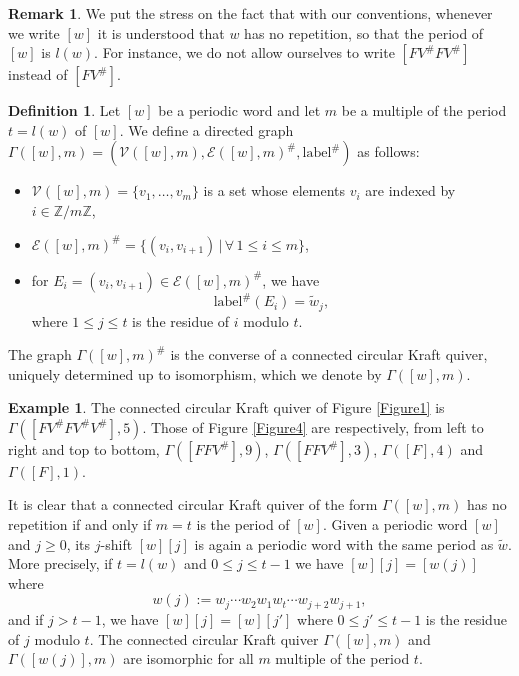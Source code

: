 \documentclass[12pt]{amsart}
\theoremstyle{definition}
\newtheorem{definition}[theorem]{Definition}
\newtheorem{remark}[theorem]{Remark}
\newtheorem{example}[theorem]{Example}
\renewcommand{\tilde}{\widetilde}
\newcommand{\<}{\langle}   %
\renewcommand{\>}{\rangle} %
\begin{document}
\begin{remark}\label{RemarkInfinitePeriodicWord}
    We put the stress on the fact that with our conventions, whenever we write $[w]$ it is understood that $w$ has no repetition, so that the period of $[w]$ is $l(w)$. For instance, we do not allow ourselves to write $[FV^{\#}FV^{\#}]$ instead of $[FV^{\#}]$.
\end{remark}

\begin{definition}\label{DefCircularKraftQuiverWithWord}
    Let $[w]$ be a periodic word and let $m$ be a multiple of the period $t = l(w)$ of $[w]$. We define a directed graph $\Gamma([w],m) = (\mathcal V([w],m), \mathcal E([w],m)^{\#}, \mathrm{label}^{\#})$ as follows:
    \begin{itemize}
        \item $\mathcal V([w],m) = \{v_1,\ldots , v_m\}$ is a set whose elements $v_i$ are indexed by $i \in \mathbb Z/m\mathbb Z$,
        \item $\mathcal E([w],m)^{\#} = \{(v_i,v_{i+1}) \,|\, \forall\, 1\leq i \leq m\}$,
        \item for $E_i = (v_i,v_{i+1}) \in \mathcal E([w],m)^{\#}$, we have 
        \begin{equation*}
            \mathrm{label}^{\#}(E_i) = \tilde w_j,
        \end{equation*}
        where $1 \leq j \leq t$ is the residue of $i$ modulo $t$.
    \end{itemize}
    The graph $\Gamma([w],m)^{\#}$ is the converse of a connected circular Kraft quiver, uniquely determined up to isomorphism, which we denote by $\Gamma([w],m)$.
\end{definition}

\begin{example}
    The connected circular Kraft quiver of Figure \ref{Figure1} is $\Gamma([FV^{\#}FV^{\#}V^{\#}],5)$. Those of Figure \ref{Figure4} are respectively, from left to right and top to bottom, $\Gamma([FFV^{\#}],9)$, $\Gamma([FFV^{\#}],3)$, $\Gamma([F],4)$ and $\Gamma([F],1)$.
\end{example}

It is clear that a connected circular Kraft quiver of the form $\Gamma([w],m)$ has no repetition if and only if $m = t$ is the period of $[w]$. Given a periodic word $[w]$ and $j \geq 0$, its $j$-shift $[w][j]$ is again a periodic word with the same period as $\tilde w$. More precisely, if $t = l(w)$ and $0 \leq j \leq t-1$ we have $[w][j] = [w(j)]$ where 
\begin{equation*}
    w(j) := w_j \cdots w_2w_1w_t \cdots w_{j+2}w_{j+1}, 
\end{equation*}
and if $j>t-1$, we have $[w][j] = [w][j']$ where $0 \leq j' \leq t-1$ is the residue of $j$ modulo $t$. The connected circular Kraft quiver $\Gamma([w],m)$ and $\Gamma([w(j)],m)$ are isomorphic for all $m$ multiple of the period $t$.
\end{document}
